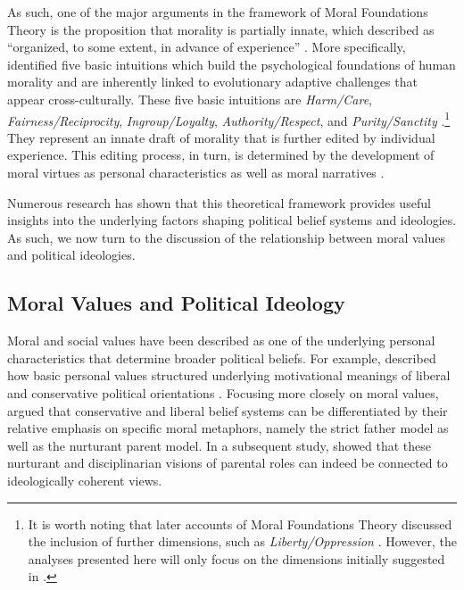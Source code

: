 \documentclass[12pt]{article}
\begin{document}
As such, one of the major arguments in the framework of Moral Foundations Theory is the proposition that morality is partially innate, which \citet[367]{haidt2008moral} described as ``organized, to some extent, in advance of experience'' \citep[but see][]{suhler2011can}. More specifically, \citet{haidt2008moral} identified five basic intuitions which build the psychological foundations of human morality and are inherently linked to evolutionary adaptive challenges that appear cross-culturally. These five basic intuitions are \textit{Harm/Care}, \textit{Fairness/Reciprocity}, \textit{Ingroup/Loyalty}, \textit{Authority/Respect}, and \textit{Purity/Sanctity} \citep[see also][]{graham2011mapping}.\footnote{It is worth noting that later accounts of Moral Foundations Theory discussed the inclusion of further dimensions, such as \textit{Liberty/Oppression} \citep[c.f.][]{graham2013moral,haidt2012righteous}. However, the analyses presented here will only focus on the dimensions initially suggested in \citet{haidt2008moral}.} They represent an innate draft of morality that is further edited by individual experience. This editing process, in turn, is determined by the development of moral virtues as personal characteristics as well as moral narratives \citep{haidt2008moral}.

Numerous research has shown that this theoretical framework provides useful insights into the underlying factors shaping political belief systems and ideologies. As such, we now turn to the discussion of the relationship between moral values and political ideologies.


\subsection{Moral Values and Political Ideology}

Moral and social values have been described as one of the underlying personal characteristics that determine broader political beliefs. For example, \citet{piurko2011basic} described how basic personal values structured underlying motivational meanings of liberal and conservative political orientations \citep[see also][]{schwartz2010basic,schwartz2011basic}. Focusing more closely on moral values, \citet{lakoff1995metaphor} argued that conservative and liberal belief systems can be differentiated by their relative emphasis on specific moral metaphors, namely the strict father model as well as the nurturant parent model. In a subsequent study, \citet{barker2006competing} showed that these nurturant and disciplinarian visions of parental roles can indeed be connected to ideologically coherent views.
\end{document}
